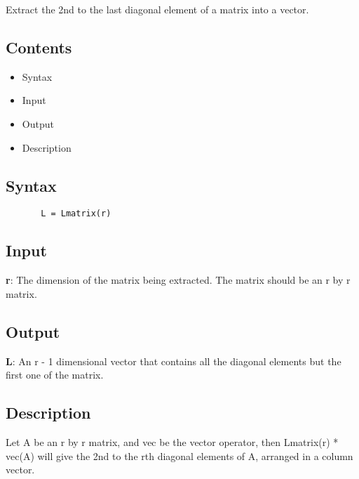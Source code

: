 \documentclass[a4paper,11pt,openany]{memoir}
\begin{document}
\begin{par}
Extract the 2nd to the last diagonal element of a matrix into a vector.
\end{par} \vspace{1em}

\subsection*{Contents}

\begin{itemize}
\setlength{\itemsep}{-1ex}
   \item Syntax
   \item Input
   \item Output
   \item Description
\end{itemize}


\subsection*{Syntax}


\begin{verbatim}       L = Lmatrix(r)\end{verbatim}
    

\subsection*{Input}

\begin{par}
\textbf{r}: The dimension of the matrix being extracted.  The matrix should be an r by r matrix.
\end{par} \vspace{1em}


\subsection*{Output}

\begin{par}
\textbf{L}: An r - 1 dimensional vector that contains all the diagonal elements but the first one of the matrix.
\end{par} \vspace{1em}


\subsection*{Description}

\begin{par}
Let A be an r by r matrix, and vec be the vector operator, then Lmatrix(r) * vec(A) will give the 2nd to the rth diagonal elements of A, arranged in a column vector.
\end{par} \vspace{1em}
\end{document}

